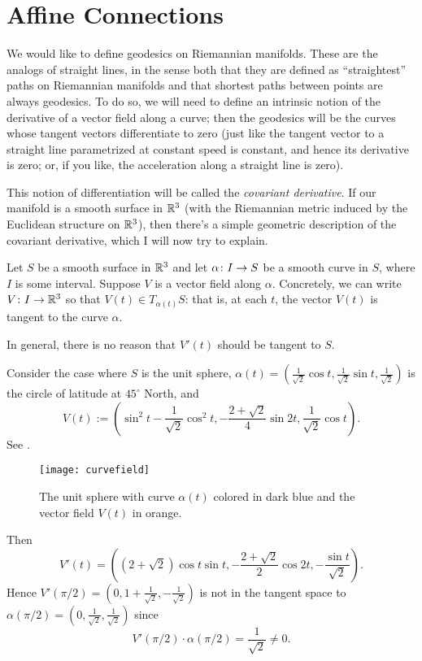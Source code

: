 
\section{Affine Connections}
\label{sec:connections}

We would like to define geodesics on Riemannian manifolds. These are the analogs of straight lines, in the sense both that they are defined as ``straightest'' paths on Riemannian manifolds and that shortest paths between points are always geodesics. To do so, we will need to define an intrinsic notion of the derivative of a vector field along a curve; then the geodesics will be the curves whose tangent vectors differentiate to zero (just like the tangent vector to a straight line parametrized at constant speed is constant, and hence its derivative is zero; or, if you like, the acceleration along a straight line is zero).

This notion of differentiation will be called the \emph{covariant derivative}. If our manifold is a smooth surface in $\mathbb{R}^3$ (with the Riemannian metric induced by the Euclidean structure on $\mathbb{R}^3$), then there's a simple geometric description of the covariant derivative, which I will now try to explain.

Let $S$ be a smooth surface in $\mathbb{R}^3$ and let $\alpha \colon\thinspace\! I \to S$ be a smooth curve in $S$, where $I$ is some interval. Suppose $V$ is a vector field along $\alpha$. Concretely, we can write $V \colon\thinspace\! I \to \mathbb{R}^3$ so that $V(t) \in T_{\alpha(t)}S$: that is, at each $t$, the vector $V(t)$ is tangent to the curve $\alpha$.

In general, there is no reason that $V'(t)$ should be tangent to $S$.

\begin{example} 
	Consider the case where $S$ is the unit sphere, $\alpha(t) = \left(\frac{1}{\sqrt{2}}\cos t, \frac{1}{\sqrt{2}}\sin t, \frac{1}{\sqrt{2}} \right)$ is the circle of latitude at $45^\circ$ North, and 
	\[
		V(t) := \left( \sin^2 t - \frac{1}{\sqrt{2}} \cos^2 t, -\frac{2+\sqrt{2}}{4} \sin 2t, \frac{1}{\sqrt{2}} \cos t\right).
	\]
	See . 
	
	\begin{figure}[htbp]
		\centering
			\texttt{[image: curvefield]}
		\caption{The unit sphere with curve $\alpha(t)$ colored in dark blue and the vector field $V(t)$ in orange.}
		\label{fig:curvefield}
	\end{figure}
	
	Then 
	\[
		V'(t) = \left((2 + \sqrt{2})\cos t \sin t,- \frac{2 + \sqrt{2}}{2}\cos 2t, - \frac{\sin t}{\sqrt{2}}\right).
	\]
	Hence $V'(\pi/2) = \left(0,1+\frac{1}{\sqrt{2}},-\frac{1}{\sqrt{2}}\right)$ is not in the tangent space to $\alpha(\pi/2) = \left(0, \frac{1}{\sqrt{2}},\frac{1}{\sqrt{2}}\right)$ since 
	\[
		V'(\pi/2) \cdot \alpha(\pi/2) = \frac{1}{\sqrt{2}} \neq 0.
	\]
\end{example}


